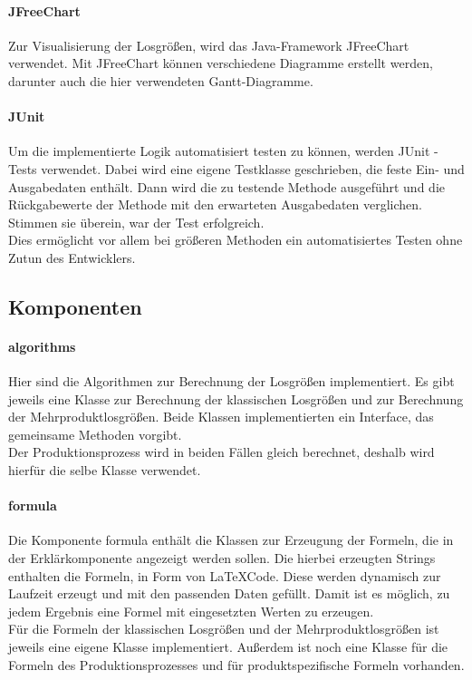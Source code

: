 \documentclass[12pt,a4paper, listof=entryprefix, bibliography=totocnumbered,toc=listofnumbered,lof=listofnumbered]{scrartcl}
\begin{document}
\paragraph{JFreeChart}
Zur Visualisierung der Losgrößen, wird das Java-Framework JFreeChart verwendet. Mit JFreeChart können verschiedene Diagramme erstellt werden, darunter auch die hier verwendeten Gantt-Diagramme. 

\paragraph{JUnit}
Um die implementierte Logik automatisiert testen zu können, werden JUnit - Tests verwendet. Dabei wird eine eigene Testklasse geschrieben, die feste Ein-  und Ausgabedaten enthält. Dann wird die zu testende Methode ausgeführt und die Rückgabewerte der Methode mit den erwarteten Ausgabedaten verglichen. Stimmen sie überein, war der Test erfolgreich.
\\
Dies ermöglicht vor allem bei größeren Methoden ein automatisiertes Testen ohne Zutun des Entwicklers.

\subsection{Komponenten}
\paragraph{algorithms}
Hier sind die Algorithmen zur Berechnung der Losgrößen implementiert. Es gibt jeweils eine Klasse zur Berechnung der klassischen Losgrößen und zur Berechnung der Mehrproduktlosgrößen. Beide Klassen implementierten ein Interface, das gemeinsame Methoden vorgibt. 
\\
Der Produktionsprozess wird in beiden Fällen gleich berechnet, deshalb wird hierfür die selbe Klasse verwendet.
\paragraph{formula}
Die Komponente formula enthält die Klassen zur Erzeugung der Formeln, die in der Erklärkomponente angezeigt werden sollen. Die hierbei erzeugten Strings enthalten die Formeln, in Form von \LaTeX Code. Diese werden dynamisch zur Laufzeit erzeugt und mit den passenden Daten gefüllt. Damit ist es möglich, zu jedem Ergebnis eine Formel mit eingesetzten Werten zu erzeugen.
\\
Für die Formeln der klassischen Losgrößen und der Mehrproduktlosgrößen ist jeweils eine eigene Klasse implementiert. Außerdem ist noch eine Klasse für die Formeln des Produktionsprozesses und für produktspezifische Formeln vorhanden.
\end{document}
